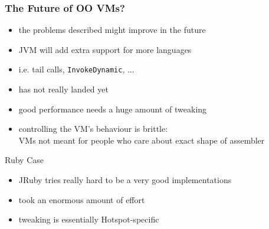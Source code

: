 \documentclass[utf8x]{beamer}
\begin{document}
 
\begin{frame}
  \frametitle{The Future of OO VMs?}
  \begin{itemize}
  \item the problems described might improve in the future
  \item JVM will add extra support for more languages
  \item i.e. tail calls, \texttt{InvokeDynamic}, ...
  \item has not really landed yet
  \item good performance needs a huge amount of tweaking
  \item controlling the VM's behaviour is brittle:\\
  VMs not meant for people who care about exact shape of assembler
  \end{itemize}
  \pause
  \begin{block}{Ruby Case}
    \begin{itemize}
    \item JRuby tries really hard to be a very good implementations
    \item took an enormous amount of effort
    \item tweaking is essentially Hotspot-specific
    \end{itemize}
  \end{block}
\end{frame}
\end{document}
